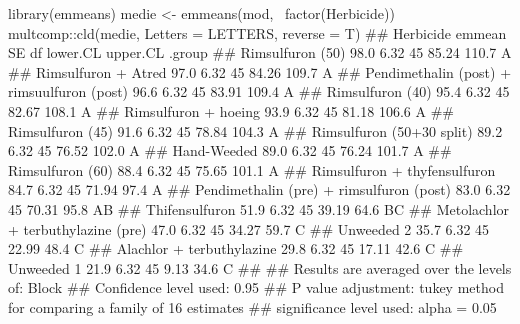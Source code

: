 \documentclass[a4paper,12pt,oneside]{book}
\newenvironment{Shaded}{}{}
\newcommand{\KeywordTok}[1]{#1}
\newcommand{\DataTypeTok}[1]{#1}
\newcommand{\StringTok}[1]{#1}
\newcommand{\CommentTok}[1]{#1}
\newcommand{\OperatorTok}[1]{#1}
\newcommand{\NormalTok}[1]{#1}
\begin{document}
\begin{Shaded}
\begin{Highlighting}[]
\KeywordTok{library}\NormalTok{(emmeans)}
\NormalTok{medie <-}\StringTok{ }\KeywordTok{emmeans}\NormalTok{(mod, }\OperatorTok{~}\KeywordTok{factor}\NormalTok{(Herbicide))}
\NormalTok{multcomp}\OperatorTok{::}\KeywordTok{cld}\NormalTok{(medie, }\DataTypeTok{Letters =}\NormalTok{ LETTERS, }\DataTypeTok{reverse =}\NormalTok{ T)}
\CommentTok{##  Herbicide                                  emmean   SE df lower.CL upper.CL .group}
\CommentTok{##  Rimsulfuron (50)                             98.0 6.32 45    85.24    110.7  A    }
\CommentTok{##  Rimsulfuron + Atred                          97.0 6.32 45    84.26    109.7  A    }
\CommentTok{##  Pendimethalin (post) + rimsuulfuron (post)   96.6 6.32 45    83.91    109.4  A    }
\CommentTok{##  Rimsulfuron (40)                             95.4 6.32 45    82.67    108.1  A    }
\CommentTok{##  Rimsulfuron + hoeing                         93.9 6.32 45    81.18    106.6  A    }
\CommentTok{##  Rimsulfuron (45)                             91.6 6.32 45    78.84    104.3  A    }
\CommentTok{##  Rimsulfuron (50+30 split)                    89.2 6.32 45    76.52    102.0  A    }
\CommentTok{##  Hand-Weeded                                  89.0 6.32 45    76.24    101.7  A    }
\CommentTok{##  Rimsulfuron (60)                             88.4 6.32 45    75.65    101.1  A    }
\CommentTok{##  Rimsulfuron + thyfensulfuron                 84.7 6.32 45    71.94     97.4  A    }
\CommentTok{##  Pendimethalin (pre) + rimsulfuron (post)     83.0 6.32 45    70.31     95.8  AB   }
\CommentTok{##  Thifensulfuron                               51.9 6.32 45    39.19     64.6   BC  }
\CommentTok{##  Metolachlor + terbuthylazine (pre)           47.0 6.32 45    34.27     59.7    C  }
\CommentTok{##  Unweeded 2                                   35.7 6.32 45    22.99     48.4    C  }
\CommentTok{##  Alachlor + terbuthylazine                    29.8 6.32 45    17.11     42.6    C  }
\CommentTok{##  Unweeded 1                                   21.9 6.32 45     9.13     34.6    C  }
\CommentTok{## }
\CommentTok{## Results are averaged over the levels of: Block }
\CommentTok{## Confidence level used: 0.95 }
\CommentTok{## P value adjustment: tukey method for comparing a family of 16 estimates }
\CommentTok{## significance level used: alpha = 0.05}
\end{Highlighting}
\end{Shaded}

\normalsize
\end{document}
